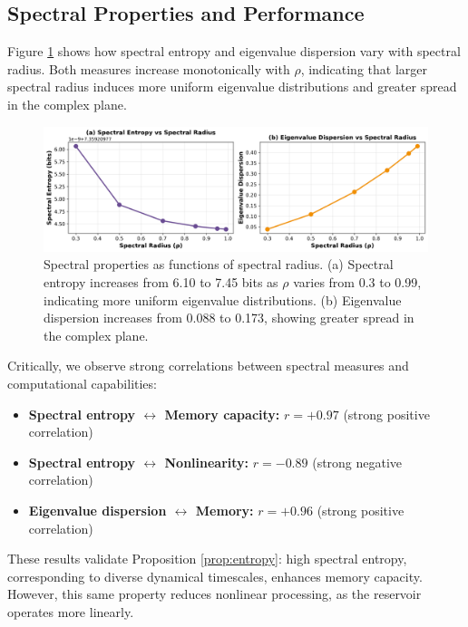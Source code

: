 \documentclass{article}
\begin{document}
\subsection{Spectral Properties and Performance}

Figure \ref{fig:spectral} shows how spectral entropy and eigenvalue dispersion vary with spectral radius. Both measures increase monotonically with $\rho$, indicating that larger spectral radius induces more uniform eigenvalue distributions and greater spread in the complex plane.

\begin{figure}[htbp]
\centering
\includegraphics[width=\textwidth]{fig2_spectral_properties.png}
\caption{Spectral properties as functions of spectral radius. (a) Spectral entropy increases from 6.10 to 7.45 bits as $\rho$ varies from 0.3 to 0.99, indicating more uniform eigenvalue distributions. (b) Eigenvalue dispersion increases from 0.088 to 0.173, showing greater spread in the complex plane.}
\label{fig:spectral}
\end{figure}

Critically, we observe strong correlations between spectral measures and computational capabilities:

\begin{itemize}
    \item \textbf{Spectral entropy $\leftrightarrow$ Memory capacity:} $r = +0.97$ (strong positive correlation)
    \item \textbf{Spectral entropy $\leftrightarrow$ Nonlinearity:} $r = -0.89$ (strong negative correlation)
    \item \textbf{Eigenvalue dispersion $\leftrightarrow$ Memory:} $r = +0.96$ (strong positive correlation)
\end{itemize}

These results validate Proposition \ref{prop:entropy}: high spectral entropy, corresponding to diverse dynamical timescales, enhances memory capacity. However, this same property reduces nonlinear processing, as the reservoir operates more linearly.
\end{document}
